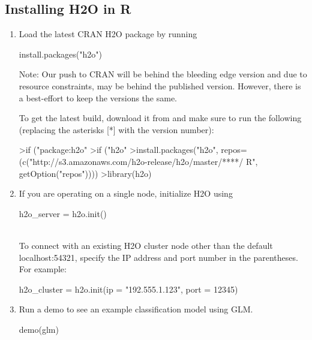 \documentclass[11pt]{article}
\begin{document}
\subsection{Installing H2O in R}
\begin{enumerate}
\item Load the latest CRAN H2O package by running \begin{spverbatim} install.packages("h2o") \end{spverbatim} 

Note: Our push to CRAN will be behind the bleeding edge version and due to resource constraints, may be behind the published version. However, there is a best-effort to keep the versions the same. 

To get the latest build, download it from  and make sure to run the following (replacing the asterisks [*] with the version number): 
\begin{spverbatim}
>if ("package:h2o" %
>if ("h2o" %
>install.packages("h2o", repos=(c("http://s3.amazonaws.com/h2o-release/h2o/master/****/
R", getOption("repos"))))
>library(h2o)
\end{spverbatim}

\item If you are operating on a single node, initialize H2O using \begin{spverbatim} h2o_server = h2o.init()\end{spverbatim}\\

To connect with an existing H2O cluster node other than the default localhost:54321, specify the IP address and port number in the parentheses. For example: \begin{spverbatim}h2o_cluster = h2o.init(ip = "192.555.1.123", port = 12345)\end{spverbatim}
\item Run a demo to see an example classification model using GLM. 
\begin{spverbatim}
demo(glm)
\end{spverbatim}
\end{enumerate}
\end{document}
